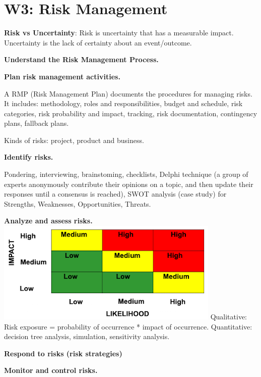 \section{W3: Risk Management}

\textbf{Risk vs Uncertainty}: Risk is uncertainty that has a measurable impact. Uncertainty is the lack of certainty about an event/outcome.

\textbf{Understand the Risk Management Process.}

    \textbf{Plan risk management activities.}

    A RMP (Risk Management Plan) documents the procedures for managing risks. It includes: methodology, roles and responsibilities, budget and schedule, risk categories, risk probability and impact, tracking, risk documentation, contingency plans, fallback plans.

    Kinds of risks: project, product and business.

    \textbf{Identify risks.}

    Pondering, interviewing, brainstoming, checklists, Delphi technique (a group of experts anonymously contribute their opinions on a topic, and then update their responses until a consensus is reached), SWOT analysis (case study) for Strengths, Weaknesses, Opportunities, Threats.

    \textbf{Analyze and assess risks.}
    \includegraphics[width=\linewidth]{figs/SCR-20240605-sqml.png}
    Qualitative: Risk exposure = probability of occurrence * impact of occurrence.
    Quantitative: decision tree analysis, simulation, sensitivity analysis.


    \textbf{Respond to risks (risk strategies)}


    \textbf{Monitor and control risks.}
